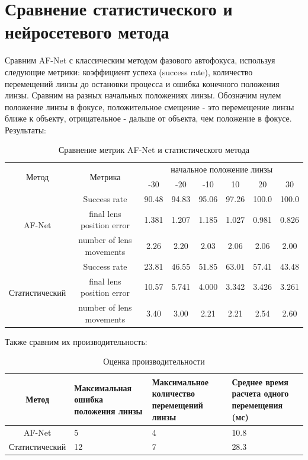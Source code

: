 \section{Сравнение статистического и нейросетевого метода}
Сравним AF-Net с классическим методом фазового автофокуса, используя следующие метрики: коэффициент успеха (success rate), количество перемещений линзы до остановки процесса и ошибка конечного положения линзы. Сравним на разных начальных положениях линзы. Обозначим нулем положение линзы в фокусе, положительное смещение - это перемещение линзы ближе к объекту, отрицательное - дальше от объекта, чем положение в фокусе. Результаты:

\begin{table}[!htbp]
	\centering
	\small
	\begin{tabular}{|c|c|c|c|c|c|c|c|}
		\hline
		\multirow{2}{*}{Метод}& \multirow{2}{*}{Метрика} & \multicolumn{6}{c|}{начальное положение линзы} \\
		\cline{3-8} & & -30 & -20 & -10 & 10 & 20 & 30\\ \hline
		\multirow{3}{*}{AF-Net} & Success rate & 90.48 & 94.83 & 95.06 & 97.26 & 100.0 & 100.0\\ 
		\cline{2-8} & final lens position error & 1.381 & 1.207 & 1.185 & 1.027 & 0.981 & 0.826 \\
		\cline{2-8} & number of lens movements & 2.26 & 2.20 & 2.03 & 2.06 & 2.06 & 2.00\\ \hline
		\multirow{3}{*}{Статистический} & Success rate & 23.81 & 46.55 & 51.85 & 63.01 & 57.41 & 43.48\\ 
		\cline{2-8} & final lens position error & 10.57 & 5.741 & 4.000 & 3.342 & 3.426 & 3.261 \\
		\cline{2-8} & number of lens movements & 3.40 & 3.00 & 2.21 & 2.21 & 2.54 & 2.60\\ \hline
	\end{tabular}
	\caption{Сравнение метрик AF-Net и статистического метода}
	\label{tab:Comparison}
\end{table}

Также сравним их производительность:

\begin{table}[!htbp]
	\centering
	\small
	\begin{tabular}{|c|p{4cm}<{\centering}|p{4cm}<{\centering}|p{4cm}<{\centering}|}
		\hline
		Метод & Максимальная ошибка положения линзы & Максимальное количество перемещений линзы & Среднее время расчета одного перемещения (мс)\\ \hline
		AF-Net & 5 & 4 & 10.8\\ \hline
		Статистический & 12 & 7 & 28.3 \\ \hline
	\end{tabular}
	\caption{Оценка производительности}
	\label{tab:performance}
\end{table}


